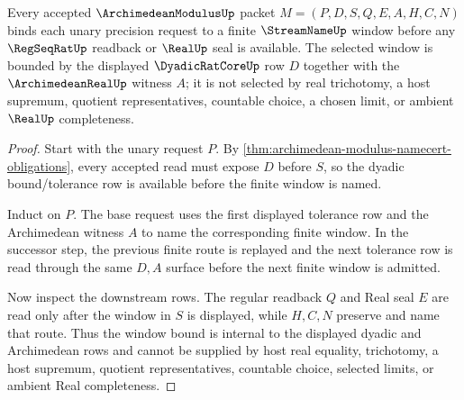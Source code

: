 \begin{theorem}
\label{thm:archimedean-modulus-window-bound}
Every accepted $\ArchimedeanModulusUp$ packet $M=(P,D,S,Q,E,A,H,C,N)$ binds each unary precision request to a finite $\StreamNameUp$ window before any $\RegSeqRatUp$ readback or $\RealUp$ seal is available. The selected window is bounded by the displayed $\DyadicRatCoreUp$ row $D$ together with the $\ArchimedeanRealUp$ witness $A$; it is not selected by real trichotomy, a host supremum, quotient representatives, countable choice, a chosen limit, or ambient $\RealUp$ completeness.
\end{theorem}
\begin{proof}
Start with the unary request $P$. By \autoref{thm:archimedean-modulus-namecert-obligations}, every accepted read must expose $D$ before $S$, so the dyadic bound/tolerance row is available before the finite window is named.

Induct on $P$. The base request uses the first displayed tolerance row and the Archimedean witness $A$ to name the corresponding finite window. In the successor step, the previous finite route is replayed and the next tolerance row is read through the same $D,A$ surface before the next finite window is admitted.

Now inspect the downstream rows. The regular readback $Q$ and Real seal $E$ are read only after the window in $S$ is displayed, while $H,C,N$ preserve and name that route. Thus the window bound is internal to the displayed dyadic and Archimedean rows and cannot be supplied by host real equality, trichotomy, a host supremum, quotient representatives, countable choice, selected limits, or ambient Real completeness.
\end{proof}

